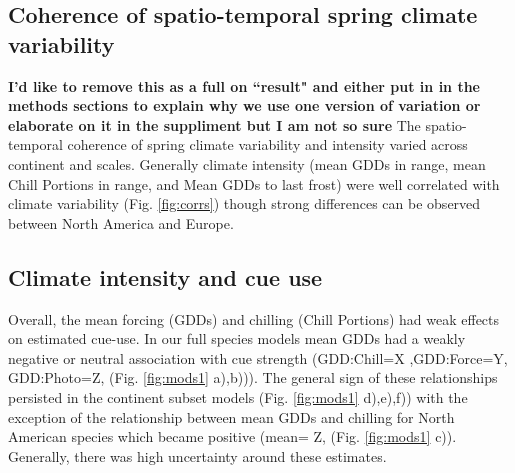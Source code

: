 \documentclass[12pt]{article}
\begin{document}
\subsection*{Coherence of spatio-temporal spring climate variability}
\textbf{I'd like to remove this as a full on ``result" and either put in in the methods sections to explain why we use one version of variation or elaborate on it in the suppliment but I am not so sure}
The spatio-temporal coherence of spring climate variability and intensity varied across continent and scales. Generally climate intensity (mean GDDs in range, mean Chill Portions in range, and Mean GDDs to last frost) were well correlated with climate variability (Fig. \ref{fig:corrs}) though strong differences can be observed between North America and Europe.  %

\subsection*{Climate intensity and cue use}
Overall, the mean forcing (GDDs) and chilling (Chill Portions) had weak effects on estimated cue-use. 
In our full species models mean GDDs had a weakly negative or neutral association with cue strength (GDD:Chill=X ,GDD:Force=Y, GDD:Photo=Z, (Fig. \ref{fig:mods1} a),b))). The general sign of these relationships persisted in the continent subset models (Fig. \ref{fig:mods1} d),e),f)) with the exception of the relationship between mean GDDs and chilling for North American species which became positive (mean= Z, (Fig. \ref{fig:mods1} c)). Generally, there was high uncertainty around these estimates.%
\end{document}
